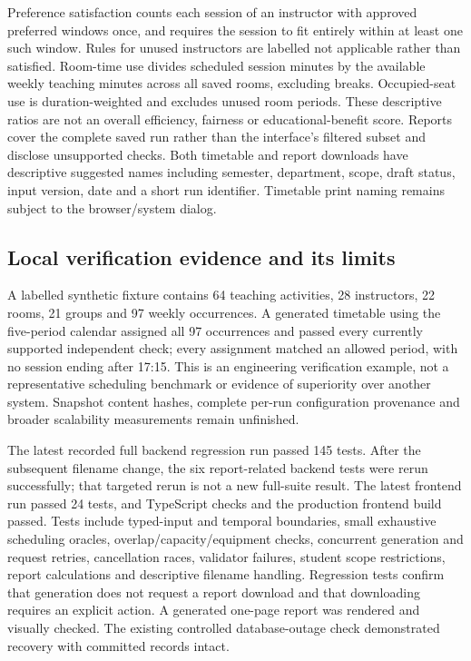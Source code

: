 \documentclass[
  11pt,a4paper,oneside]{report}
\begin{document}
Preference satisfaction counts each session of an instructor with approved preferred windows once, and requires the session to fit entirely within at least one such window. Rules for unused instructors are labelled not applicable rather than satisfied. Room-time use divides scheduled session minutes by the available weekly teaching minutes across all saved rooms, excluding breaks. Occupied-seat use is duration-weighted and excludes unused room periods. These descriptive ratios are not an overall efficiency, fairness or educational-benefit score. Reports cover the complete saved run rather than the interface's filtered subset and disclose unsupported checks. Both timetable and report downloads have descriptive suggested names including semester, department, scope, draft status, input version, date and a short run identifier. Timetable print naming remains subject to the browser/system dialog.

\subsection{Local verification evidence and its limits}
A labelled synthetic fixture contains 64 teaching activities, 28 instructors, 22 rooms, 21 groups and 97 weekly occurrences. A generated timetable using the five-period calendar assigned all 97 occurrences and passed every currently supported independent check; every assignment matched an allowed period, with no session ending after 17:15. This is an engineering verification example, not a representative scheduling benchmark or evidence of superiority over another system. Snapshot content hashes, complete per-run configuration provenance and broader scalability measurements remain unfinished.

The latest recorded full backend regression run passed 145 tests. After the subsequent filename change, the six report-related backend tests were rerun successfully; that targeted rerun is not a new full-suite result. The latest frontend run passed 24 tests, and TypeScript checks and the production frontend build passed. Tests include typed-input and temporal boundaries, small exhaustive scheduling oracles, overlap/capacity/equipment checks, concurrent generation and request retries, cancellation races, validator failures, student scope restrictions, report calculations and descriptive filename handling. Regression tests confirm that generation does not request a report download and that downloading requires an explicit action. A generated one-page report was rendered and visually checked. The existing controlled database-outage check demonstrated recovery with committed records intact.
\end{document}
